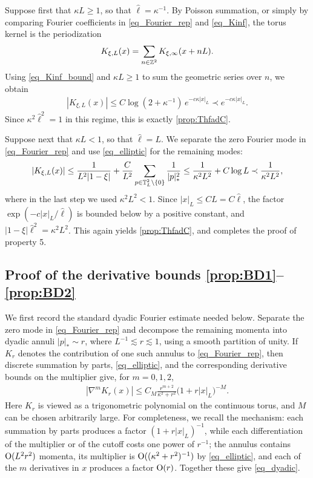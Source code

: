 Suppose first that $\kappa L\geq1$, so that $\hat\ell=\kappa^{-1}$. By Poisson summation, or simply by comparing Fourier coefficients in \eqref{eq_Fourier_rep} and \eqref{eq_Kinf}, the torus kernel is the periodization
%
\begin{align*}
K_{\xi,L}(x)=\sum_{n\in\mathbb{Z}^{2}}K_{\xi,\infty}(x+nL).
\end{align*}
%
Using \eqref{eq_Kinf_bound} and $\kappa L\geq1$ to sum the geometric series over $n$, we obtain
%
\begin{align*}
|K_{\xi,L}(x)|\leq C\log(2+\kappa^{-1})\,e^{-c\kappa|x|_{L}}\prec e^{-c\kappa|x|_{L}}.
\end{align*}
%
Since $\kappa^{2}\hat\ell^{2}=1$ in this regime, this is exactly \eqref{prop:ThfadC}.

Suppose next that $\kappa L<1$, so that $\hat\ell=L$. We separate the zero Fourier mode in \eqref{eq_Fourier_rep} and use \eqref{eq_elliptic} for the remaining modes:
%
\begin{align*}
|K_{\xi,L}(x)|\leq\frac{1}{L^{2}|1-\xi|}+\frac{C}{L^{2}}\sum_{p\in\mathbb T_{L}^{2}\setminus\{0\}}\frac{1}{|p|_{*}^{2}}\leq\frac{1}{\kappa^{2}L^{2}}+C\log L\prec\frac{1}{\kappa^{2}L^{2}},
\end{align*}
%
where in the last step we used $\kappa^{2}L^{2}<1$. Since $|x|_{L}\leq CL=C\hat\ell$, the factor $\exp(-c|x|_{L}/\hat\ell)$ is bounded below by a positive constant, and $|1-\xi|\hat\ell^{2}=\kappa^{2}L^{2}$. This again yields \eqref{prop:ThfadC}, and completes the proof of property 5.

\subsection{Proof of the derivative bounds \texorpdfstring{\eqref{prop:BD1}--\eqref{prop:BD2}}{(6)}}

We first record the standard dyadic Fourier estimate needed below. Separate the zero mode in \eqref{eq_Fourier_rep} and decompose the remaining momenta into dyadic annuli $|p|_{*}\sim r$, where $L^{-1}\lesssim r\lesssim1$, using a smooth partition of unity. If $K_{r}$ denotes the contribution of one such annulus to \eqref{eq_Fourier_rep}, then discrete summation by parts, \eqref{eq_elliptic}, and the corresponding derivative bounds on the multiplier give, for $m=0,1,2$,
%
\begin{align}
|\nabla^{m}K_{r}(x)|\leq C_{M}\frac{r^{m+2}}{\kappa^{2}+r^{2}}\big(1+r|x|_{L}\big)^{-M}.\label{eq_dyadic}
\end{align}
%
Here $K_{r}$ is viewed as a trigonometric polynomial on the continuous torus, and $M$ can be chosen arbitrarily large. For completeness, we recall the mechanism: each summation by parts produces a factor $(1+r|x|_{L})^{-1}$, while each differentiation of the multiplier or of the cutoff costs one power of $r^{-1}$; the annulus contains $\operatorname{O}(L^{2}r^{2})$ momenta, its multiplier is $\operatorname{O}((\kappa^{2}+r^{2})^{-1})$ by \eqref{eq_elliptic}, and each of the $m$ derivatives in $x$ produces a factor $\operatorname{O}(r)$. Together these give \eqref{eq_dyadic}.

